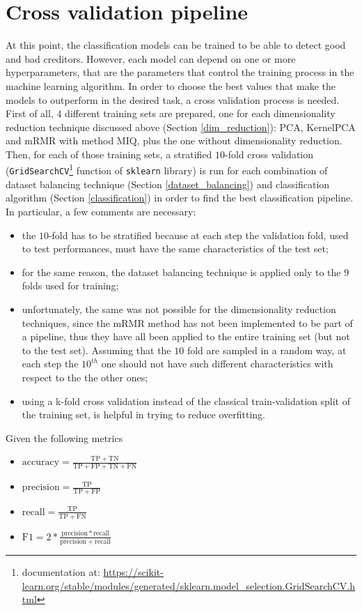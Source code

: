 \documentclass[letterpaper]{article}
\begin{document}
	\section{Cross validation pipeline} \label{cv}
	At this point, the classification models can be trained to be able to detect good and bad creditors. However, each model can depend on one or more hyperparameters, that are the parameters that control the training process in the machine learning algorithm. In order to choose the best values that make the models to outperform in the desired task, a cross validation process is needed. \\
	First of all, $4$ different training sets are prepared, one for each dimensionality reduction technique discussed above (Section \ref{dim_reduction}): PCA, KernelPCA and mRMR with method MIQ, plus the one without dimensionality reduction.\\
	Then, for each of those training sets, a stratified $10$-fold cross validation (\texttt{GridSearchCV}\footnote{documentation at: \url{https://scikit-learn.org/stable/modules/generated/sklearn.model_selection.GridSearchCV.html}} function of \texttt{sklearn} library) is run for each combination of dataset balancing technique (Section \ref{dataset_balancing}) and classification algorithm (Section \ref{classification}) in order to find the best classification pipeline. 
	In particular, a few comments are necessary:
	\begin{itemize}
		\item the $10$-fold has to be stratified because at each step the validation fold, used to test performances, must have the same characteristics of the test set;
		\item for the same reason, the dataset balancing technique is applied only to the $9$ folds used for training;
		\item unfortunately, the same was not possible for the dimensionality reduction techniques, since the mRMR method has not been implemented to be part of a pipeline, thus they have all been applied to the entire training set (but not to the test set). Assuming that the $10$ fold are sampled in a random way, at each step the $10^{th}$ one should not have such different characteristics with respect to the the other ones;
		\item using a k-fold cross validation instead of the classical train-validation split of the training set, is helpful in trying to reduce overfitting.
	\end{itemize}
	Given the following metrics
	\begin{itemize}
		\item $\mathrm{accuracy} = \frac{\mathrm{TP}+\mathrm{TN}}{\mathrm{TP}+\mathrm{FP}+\mathrm{TN}+\mathrm{FN}}$
		\item $\mathrm{precision} = \frac{\mathrm{TP}}{\mathrm{TP}+\mathrm{FP}}$ 
		\item $\mathrm{recall} =  \frac{\mathrm{TP}}{\mathrm{TP}+\mathrm{FN}}$
		\item $\mathrm{F1} = 2 * \frac{\mathrm{precision}*\mathrm{recall}}{\mathrm{precis	ion}+\mathrm{recall}}$
	\end{itemize}
\end{document}
